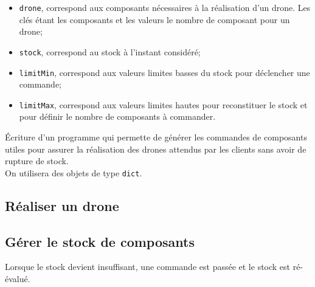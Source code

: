 \begin{itemize}
\item \texttt{drone}, correspond aux composants nécessaires à la réalisation d'un drone. Les clés étant les composants et les valeurs le nombre de composant pour un drone;
\item \texttt{stock}, correspond au stock à l'instant considéré;
\item \texttt{limitMin}, correspond aux valeurs limites basses du stock pour déclencher une commande;
\item \texttt{limitMax}, correspond aux valeurs limites hautes pour reconstituer le stock et pour définir le nombre de composants à commander.
\end{itemize}

\begin{obj}
\'Ecriture d'un programme qui permette de générer les commandes de composants utiles pour assurer la réalisation des drones attendus par les clients sans avoir de rupture de stock.\\
On utilisera des objets de type \texttt{dict}.
\end{obj}

\subsection*{Réaliser un drone}



\subsection*{Gérer le stock de composants}




Lorsque le stock devient insuffisant, une commande est passée et le stock est ré-évalué.


